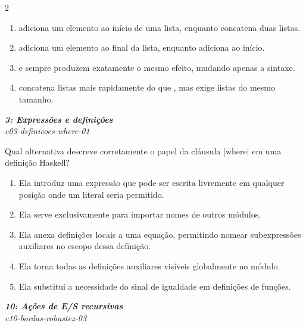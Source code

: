 \documentclass[a4paper,10pt,brazil]{article}
\begin{document}
\begin{multicols}{2}
\begin{enumerate}
  \item \haskellinline{(:)} adiciona um elemento ao início de uma lista, enquanto \haskellinline{(++)} concatena duas listas.

  \item \haskellinline{(:)} adiciona um elemento ao final da lista, enquanto \haskellinline{(++)} adiciona ao início.

  \item \haskellinline{(:)} e \haskellinline{(++)} sempre produzem exatamente o mesmo efeito, mudando apenas a sintaxe.

  \item \haskellinline{(:)} concatena listas mais rapidamente do que \haskellinline{(++)}, mas exige listas do mesmo tamanho.


\end{enumerate}

\begin{flushright}
  \footnotesize
  \textit{\textbf{3: Expressões e definições}}\\
  \textit{c03-definicoes-where-01}\\

\end{flushright}
Qual alternativa descreve corretamente o papel da cláusula \haskellinline|where| em uma definição Haskell?

\begin{enumerate}
  \item Ela introduz uma expressão que pode ser escrita livremente em qualquer posição onde um literal seria permitido.

  \item Ela serve exclusivamente para importar nomes de outros módulos.

  \item Ela anexa definições locais a uma equação, permitindo nomear subexpressões auxiliares no escopo dessa definição.

  \item Ela torna todas as definições auxiliares visíveis globalmente no módulo.

  \item Ela substitui a necessidade do sinal de igualdade em definições de funções.


\end{enumerate}

\begin{flushright}
  \footnotesize
  \textit{\textbf{10: Ações de E/S recursivas}}\\
  \textit{c10-bordas-robustez-03}\\


\end{flushright}
\end{multicols}
\end{document}

